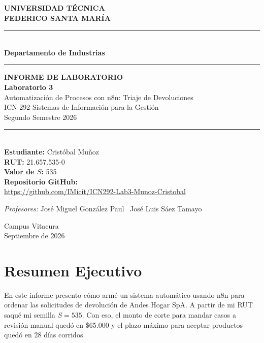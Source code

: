 \documentclass[11pt,letterpaper]{article}
\begin{document}
\begin{titlepage}
\begin{center}
\vspace*{0.8cm}

{\large\bfseries UNIVERSIDAD TÉCNICA\\FEDERICO SANTA MARÍA}\\[4pt]
{\color{usmblue}\rule{0.5\textwidth}{0.8pt}}\\[4pt]
{\bfseries Departamento de Industrias}\\[4pt]
{\color{usmblue}\rule{0.5\textwidth}{0.8pt}}

\vspace{2cm}

{\small\bfseries INFORME DE LABORATORIO}\\[8pt]
{\Huge\bfseries\color{usmblue} Laboratorio 3}\\[6pt]
{\Large Automatización de Procesos con n8n: Triaje de Devoluciones}\\[10pt]
{\large ICN 292 Sistemas de Información para la Gestión}\\
{\large Segundo Semestre 2026}

\vspace{1.8cm}
{\color{usmblue}\rule{0.35\textwidth}{0.5pt}}\\[8pt]
\textbf{Estudiante:} Cristóbal Muñoz \\
\textbf{RUT:} 21.657.535-0 \\
\textbf{Valor de $S$:} 535 \\
\vspace{0.3cm}
\textbf{Repositorio GitHub:} \\
\url{https://github.com/IMicit/ICN292-Lab3-Munoz-Cristobal}

\vspace{1.5cm}
\textit{Profesores:} José Miguel González Paul \textperiodcentered\ José Luis Sáez Tamayo

\vfill
Campus Vitacura\\
Septiembre de 2026
\end{center}
\end{titlepage}

\section*{Resumen Ejecutivo}

En este informe presento cómo armé un sistema automático usando n8n para ordenar las solicitudes de devolución de Andes Hogar SpA. A partir de mi RUT saqué mi semilla $S = 535$. Con eso, el monto de corte para mandar casos a revisión manual quedó en \$65.000 y el plazo máximo para aceptar productos quedó en 28 días corridos.
\end{document}
